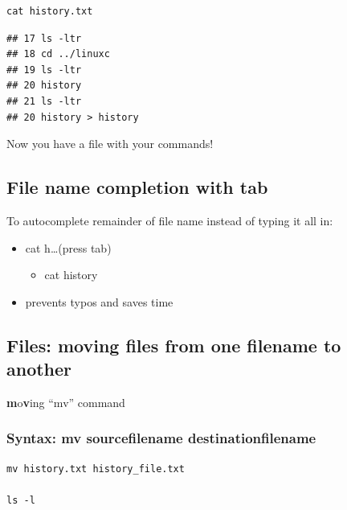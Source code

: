 \documentclass[
]{book}
\providecommand{\tightlist}{%
  \setlength{\itemsep}{0pt}\setlength{\parskip}{0pt}}
\begin{document}
\begin{verbatim}
cat history.txt
\end{verbatim}

\begin{verbatim}
## 17 ls -ltr
## 18 cd ../linuxc
## 19 ls -ltr
## 20 history
## 21 ls -ltr
## 20 history > history
\end{verbatim}

Now you have a file with your commands!

\hypertarget{file-name-completion-with-tab}{%
\subsection{File name completion with tab}\label{file-name-completion-with-tab}}

To autocomplete remainder of file name instead of typing it all in:

\begin{itemize}
\tightlist
\item
  cat h\ldots(press tab)

  \begin{itemize}
  \tightlist
  \item
    cat history
  \end{itemize}
\item
  prevents typos and saves time
\end{itemize}

\hypertarget{files-moving-files-from-one-filename-to-another}{%
\subsection{Files: moving files from one filename to another}\label{files-moving-files-from-one-filename-to-another}}

\textbf{m}o\textbf{v}ing ``mv'' command

\hypertarget{syntax-mv-sourcefilename-destinationfilename}{%
\subsubsection*{Syntax: mv sourcefilename destinationfilename}\label{syntax-mv-sourcefilename-destinationfilename}}

\begin{verbatim}
mv history.txt history_file.txt

ls -l
\end{verbatim}
\end{document}
